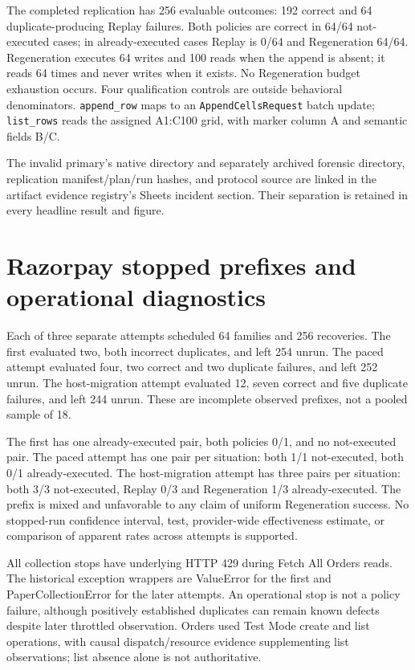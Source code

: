 \documentclass[conference]{IEEEtran}
\newcommand{\codeurl}[1]{{\def\UrlFont{\ttfamily}\nolinkurl{#1}}}
\begin{document}
{\raggedright The completed replication has 256 evaluable outcomes: 192 correct and 64 duplicate-producing Replay failures. Both policies are correct in 64/64 not-executed cases; in already-executed cases Replay is 0/64 and Regeneration 64/64. Regeneration executes 64 writes and 100 reads when the append is absent; it reads 64 times and never writes when it exists. No Regeneration budget exhaustion occurs. Four qualification controls are outside behavioral denominators. \codeurl{append_row} maps to an \codeurl{AppendCellsRequest} batch update; \codeurl{list_rows} reads the assigned A1:C100 grid, with marker column A and semantic fields B/C.\par}


The invalid primary's native directory and separately archived forensic directory, replication manifest/plan/run hashes, and protocol source are linked in the artifact evidence registry's Sheets incident section. Their separation is retained in every headline result and figure.


\section{Razorpay stopped prefixes and operational diagnostics}

Each of three separate attempts scheduled 64 families and 256 recoveries. The first evaluated two, both incorrect duplicates, and left 254 unrun. The paced attempt evaluated four, two correct and two duplicate failures, and left 252 unrun. The host-migration attempt evaluated 12, seven correct and five duplicate failures, and left 244 unrun. These are incomplete observed prefixes, not a pooled sample of 18.


The first has one already-executed pair, both policies 0/1, and no not-executed pair. The paced attempt has one pair per situation: both 1/1 not-executed, both 0/1 already-executed. The host-migration attempt has three pairs per situation: both 3/3 not-executed, Replay 0/3 and Regeneration 1/3 already-executed. The prefix is mixed and unfavorable to any claim of uniform Regeneration success. No stopped-run confidence interval, test, provider-wide effectiveness estimate, or comparison of apparent rates across attempts is supported.


All collection stops have underlying HTTP 429 during Fetch All Orders reads. The historical exception wrappers are ValueError for the first and PaperCollectionError for the later attempts. An operational stop is not a policy failure, although positively established duplicates can remain known defects despite later throttled observation. Orders used Test Mode create and list operations, with causal dispatch/resource evidence supplementing list observations; list absence alone is not authoritative.
\end{document}
